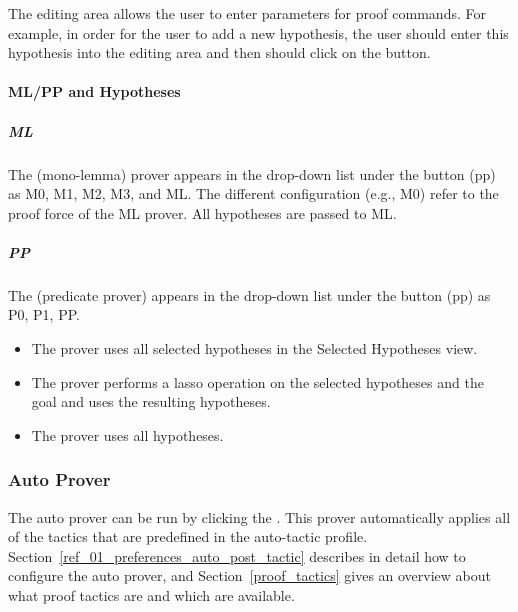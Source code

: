 The editing area allows the user to enter parameters for proof commands. For example, in order for the user to add a new hypothesis, the user should enter this hypothesis into the editing area and then should click on the  button.

\paragraph{ML/PP and Hypotheses}

\subparagraph{ML}

The  (mono-lemma) prover appears in the drop-down list under the button (pp) as M0, M1, M2, M3, and ML. The different configuration (e.g., M0) refer to the proof force of the ML prover. All hypotheses are passed to ML.

\subparagraph{PP}

The  (predicate prover) appears in the drop-down list under the button (pp) as P0, P1, PP.

\begin{itemize}
	\item The  prover uses all selected hypotheses in the \textsf{Selected Hypotheses} view.
	\item The  prover performs a lasso operation on the selected hypotheses and the goal and uses the resulting hypotheses.
	\item The  prover uses all hypotheses. 
\end{itemize}

\subsubsection{Auto Prover}
\label{auto_prover}

The auto prover can be run by clicking the . This prover automatically applies all of the tactics that are predefined in the auto-tactic profile. Section~\ref{ref_01_preferences_auto_post_tactic} describes in detail how to configure the auto prover, and Section~\ref{proof_tactics} gives an overview about what proof tactics are and which are available.


